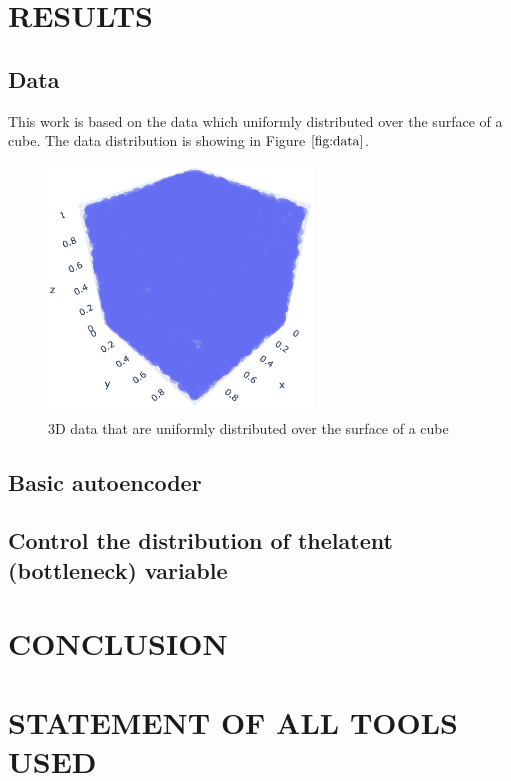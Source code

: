 \documentclass{article}
\begin{document}
\section{RESULTS}
\label{sec:results}

\subsection{Data}
\label{ssec:data}

This work is based on the data which uniformly distributed over the surface of a cube. 
The data distribution is showing in Figure $\ref{fig:data}$.

\begin{figure}[htb]
  \begin{minipage}[b]{1.0\linewidth}
    \centering
    \centerline{\includegraphics[width=7.0cm]{images/data}}
  \end{minipage}
  \caption{3D data that are uniformly distributed over the surface of a cube}
  \label{fig:data}
  \end{figure}

\subsection{Basic autoencoder}
\label{ssec:basicautoencoder}

\subsection{Control the distribution of thelatent (bottleneck) variable}
\label{ssec:VAE}


\section{CONCLUSION}
\label{sec:conclusion}


\section{STATEMENT OF ALL TOOLS USED}
\label{sec:statementofalltoolsused}
\end{document}
